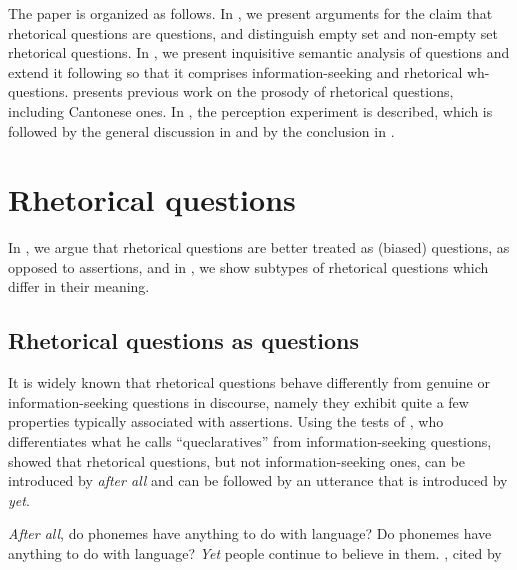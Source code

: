 \documentclass[output=paper,colorlinks,citecolor=brown            ,chinesefont]{langscibook}
\begin{document}
The paper is organized as follows. In , we present arguments for the claim that rhetorical questions are questions, and distinguish empty set and non-empty set rhetorical questions. In , we present  inquisitive semantic analysis of questions and extend it following \citet{Kiss+2021} so that it comprises information-seeking and rhetorical wh-questions.  presents previous work on the prosody of rhetorical questions, including Cantonese ones. In , the perception experiment is described, which is followed by the general discussion in  and by the conclusion in .

\section{Rhetorical questions}
\label{sec:RQ}

In , we argue that rhetorical questions are better treated as (biased) questions, as opposed to assertions, and in , we show subtypes of rhetorical questions which differ in their meaning.

\subsection{Rhetorical questions as questions}
\label{subsec:questions}

It is widely known that rhetorical questions behave differently from genuine or information-seeking questions in discourse, namely they exhibit quite a few properties typically associated with assertions. Using the tests of \citet{Sadock1971,Sadock1974}, who differentiates what he calls ``queclaratives'' from information-seeking questions, \citet{Han2002} showed that rhetorical questions, but not information-seeking ones, can be introduced by \textit{after all} and can be followed by an utterance that is introduced by \textit{yet}. 

\begin{exe}
\ex\label{Sadock} 
\begin{xlist}
\ex\label{Sadock1} \textit{After all}, do phonemes have anything to do with language?
\ex\label{Sadock2} Do phonemes have anything to do with language? \textit{Yet} people continue to believe in them. \hfill \citet[225]{Sadock1971}, cited by \citet{Han2002}
\end{xlist}
\end{exe}
\end{document}
